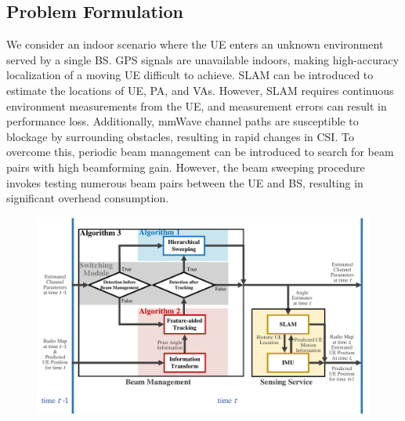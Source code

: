 \documentclass[journal,12pt,onecolumn,draftclsnofoot,]{IEEEtran}
\begin{document}
\subsection{Problem Formulation}
\vspace{-1.5mm}
We consider an indoor scenario where the UE enters an unknown environment served by a single BS. 
GPS signals are unavailable indoors, making high-accuracy localization of a moving UE difficult to achieve. 
SLAM can be introduced to estimate the locations of UE, PA, and VAs. However, SLAM requires continuous environment measurements from the UE, and measurement errors can result in performance loss. 
Additionally, mmWave channel paths are susceptible to blockage by surrounding obstacles, resulting in rapid changes in CSI. To overcome this, periodic beam management can be introduced to search for beam pairs with high beamforming gain. 
However, the beam sweeping procedure invokes testing numerous beam pairs between the UE and BS, resulting in significant overhead consumption. 
{\color{black}{To address these challenges, this study proposes a joint design where SLAM and beam management can mutually assist each other. By leveraging this joint design, the UE can achieve high-accuracy localization, construct a radio map of the environment, and effectively manage beams. }}


\begin{figure}
\centering
\includegraphics[scale=0.466]{fig3.pdf}\vspace{-2.5mm}
\caption{{\color{black}{Block diagram of the proposed joint beam management and SLAM design.}}}
\label{c}%
\vspace{-6mm}
\end{figure}
\vspace{-2.5mm}
\end{document}
